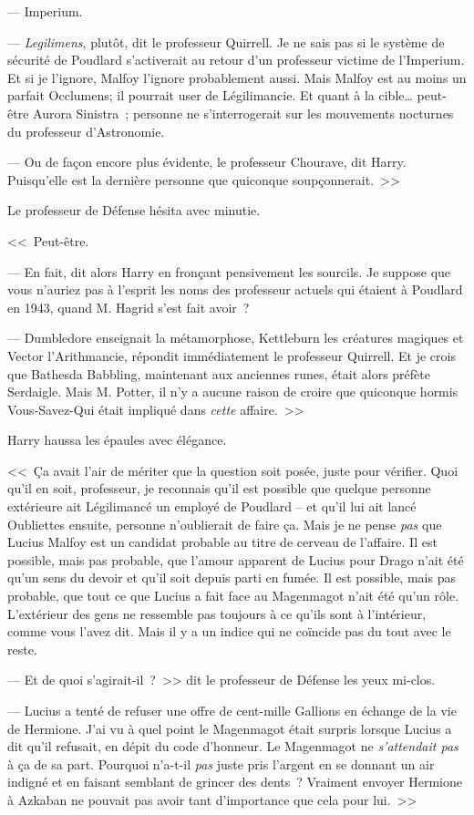 --- Imperium.

--- \emph{Legilimens}, plutôt, dit le professeur Quirrell. Je ne sais pas si le système de sécurité de Poudlard s'activerait au retour d'un professeur victime de l'Imperium. Et si je l'ignore, Malfoy l'ignore probablement aussi. Mais Malfoy est au moins un parfait Occlumens; il pourrait user de Légilimancie. Et quant à la cible… peut-être Aurora Sinistra~; personne ne s'interrogerait sur les mouvements nocturnes du professeur d'Astronomie.

--- Ou de façon encore plus évidente, le professeur Chourave, dit Harry. Puisqu'elle est la dernière personne que quiconque soupçonnerait.~>>

Le professeur de Défense hésita avec minutie.

<<~Peut-être.

--- En fait, dit alors Harry en fronçant pensivement les sourcils. Je suppose que vous n'auriez pas à l'esprit les noms des professeur actuels qui étaient à Poudlard en 1943, quand M. Hagrid s'est fait avoir~?

--- Dumbledore enseignait la métamorphose, Kettleburn les créatures magiques et Vector l'Arithmancie, répondit immédiatement le professeur Quirrell. Et je crois que Bathesda Babbling, maintenant aux anciennes runes, était alors préfète Serdaigle. Mais M. Potter, il n'y a aucune raison de croire que quiconque hormis Vous-Savez-Qui était impliqué dans \emph{cette} affaire.~>>

Harry haussa les épaules avec élégance.

<<~Ça avait l'air de mériter que la question soit posée, juste pour vérifier. Quoi qu'il en soit, professeur, je reconnais qu'il est possible que quelque personne extérieure ait Légilimancé un employé de Poudlard -- et qu'il lui ait lancé Oubliettes ensuite, personne n'oublierait de faire ça. Mais je ne pense \emph{pas} que Lucius Malfoy est un candidat probable au titre de cerveau de l'affaire. Il est possible, mais pas probable, que l'amour apparent de Lucius pour Drago n'ait été qu'un sens du devoir et qu'il soit depuis parti en fumée. Il est possible, mais pas probable, que tout ce que Lucius a fait face au Magenmagot n'ait été qu'un rôle. L'extérieur des gens ne ressemble pas toujours à ce qu'ils sont à l'intérieur, comme vous l'avez dit. Mais il y a un indice qui ne coïncide pas du tout avec le reste.

--- Et de quoi s'agirait-il~?~>> dit le professeur de Défense les yeux mi-clos.

--- Lucius a tenté de refuser une offre de cent-mille Gallions en échange de la vie de Hermione. J'ai vu à quel point le Magenmagot était surpris lorsque Lucius a dit qu'il refusait, en dépit du code d'honneur. Le Magenmagot ne \emph{s'attendait pas} à ça de sa part. Pourquoi n'a-t-il \emph{pas} juste pris l'argent en se donnant un air indigné et en faisant semblant de grincer des dents~? Vraiment envoyer Hermione à Azkaban ne pouvait pas avoir tant d'importance que cela pour lui.~>>


